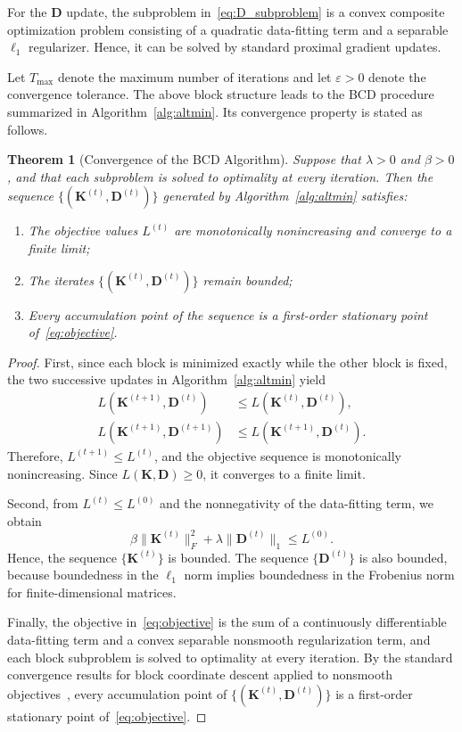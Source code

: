 \documentclass[letterpaper,10pt,conference]{ieeeconf}
\newtheorem{theorem}{Theorem}[section]
\newcommand{\Kmat}{\mathbf{K}}
\newcommand{\Dmat}{\mathbf{D}}
\begin{document}
For the $\Dmat$ update, the subproblem in~\eqref{eq:D_subproblem} is a convex composite optimization problem consisting of a quadratic data-fitting term and a separable $\ell_1$ regularizer. Hence, it can be solved by standard proximal gradient updates.

Let $T_{\max}$ denote the maximum number of iterations and let $\varepsilon>0$ denote the convergence tolerance. The above block structure leads to the BCD procedure summarized in Algorithm~\ref{alg:altmin}. Its convergence property is stated as follows.

\begin{theorem}[Convergence of the BCD Algorithm]
\label{thm:altmin_convergence}
Suppose that $\lambda>0$ and $\beta>0$, and that each subproblem is solved to optimality at every iteration. Then the sequence $\{(\Kmat^{(t)}, \Dmat^{(t)})\}$ generated by Algorithm~\ref{alg:altmin} satisfies:
\begin{enumerate}
\item The objective values $L^{(t)}$ are monotonically nonincreasing and converge to a finite limit;
\item The iterates $\{(\Kmat^{(t)},\Dmat^{(t)})\}$ remain bounded;
\item Every accumulation point of the sequence is a first-order stationary point of~\eqref{eq:objective}.
\end{enumerate}
\end{theorem}

\begin{proof}
First, since each block is minimized exactly while the other block is fixed, the two successive updates in Algorithm~\ref{alg:altmin} yield
\[
\begin{aligned}
L(\Kmat^{(t+1)},\Dmat^{(t)}) &\le L(\Kmat^{(t)},\Dmat^{(t)}), \\
L(\Kmat^{(t+1)},\Dmat^{(t+1)}) &\le L(\Kmat^{(t+1)},\Dmat^{(t)}).
\end{aligned}
\]
Therefore, $L^{(t+1)} \le L^{(t)}$, and the objective sequence is monotonically nonincreasing. Since $L(\Kmat,\Dmat) \ge 0$, it converges to a finite limit.

Second, from $L^{(t)} \le L^{(0)}$ and the nonnegativity of the data-fitting term, we obtain
\[
\beta\|\Kmat^{(t)}\|_F^2 + \lambda\|\Dmat^{(t)}\|_1 \le L^{(0)}.
\]
Hence, the sequence $\{\Kmat^{(t)}\}$ is bounded. The sequence $\{\Dmat^{(t)}\}$ is also bounded, because boundedness in the $\ell_1$ norm implies boundedness in the Frobenius norm for finite-dimensional matrices.

Finally, the objective in~\eqref{eq:objective} is the sum of a continuously differentiable data-fitting term and a convex separable nonsmooth regularization term, and each block subproblem is solved to optimality at every iteration. By the standard convergence results for block coordinate descent applied to nonsmooth objectives~\cite{Tseng2001}, every accumulation point of $\{(\Kmat^{(t)},\Dmat^{(t)})\}$ is a first-order stationary point of~\eqref{eq:objective}.
\end{proof}
\end{document}
